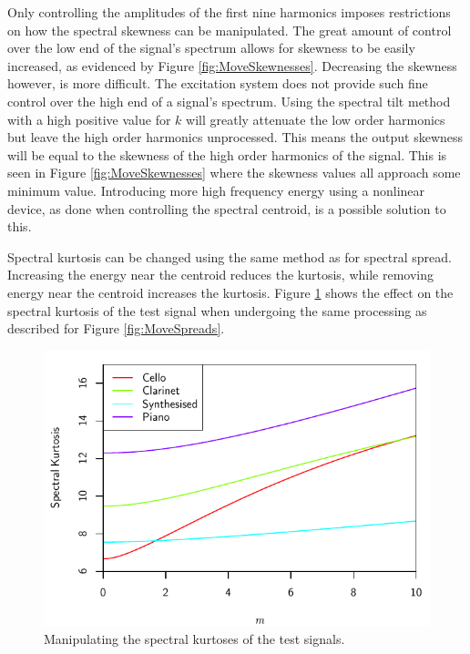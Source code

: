 			Only controlling the amplitudes of the first nine harmonics imposes restrictions on how the
			spectral skewness can be manipulated. The great amount of control over the low end of the signal's
			spectrum allows for skewness to be easily increased, as evidenced by Figure
			\ref{fig:MoveSkewnesses}.  Decreasing the skewness however, is more difficult. The excitation
			system does not provide such fine control over the high end of a signal's spectrum. Using the
			spectral tilt method with a high positive value for $k$ will greatly attenuate the low order
			harmonics but leave the high order harmonics unprocessed. This means the output skewness will be
			equal to the skewness of the high order harmonics of the signal. This is seen in Figure
			\ref{fig:MoveSkewnesses} where the skewness values all approach some minimum value. Introducing
			more high frequency energy using a nonlinear device, as done when controlling the spectral
			centroid, is a possible solution to this.

			Spectral kurtosis can be changed using the same method as for spectral spread. Increasing the
			energy near the centroid reduces the kurtosis, while removing energy near the centroid increases
			the kurtosis. Figure \ref{fig:MoveKurtoses} shows the effect on the spectral kurtosis of the test
			signal when undergoing the same processing as described for Figure \ref{fig:MoveSpreads}.
			
			\begin{figure}[h!]
				\centering
				\includegraphics{chapter6/Images/MoveKurtoses.pdf}
				\caption{Manipulating the spectral kurtoses of the test signals.}
				\label{fig:MoveKurtoses}
			\end{figure}

